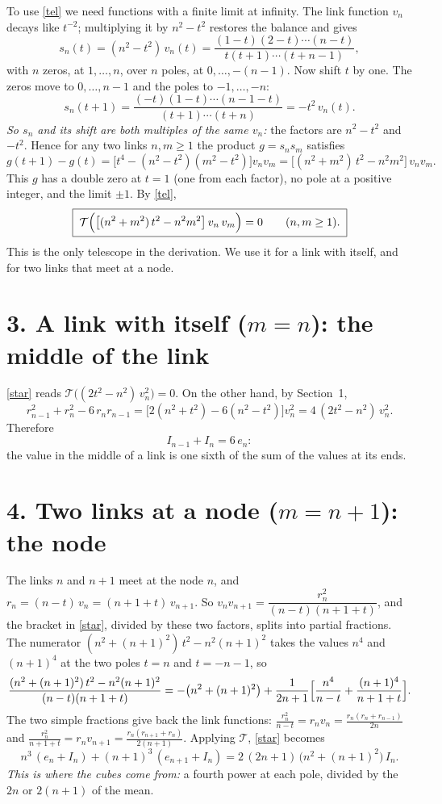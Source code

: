 \documentclass[11pt]{article}
\newcommand{\T}{\mathcal T}
\begin{document}
To use \eqref{tel} we need functions with a finite limit at infinity. The link function $v_n$ decays
like $t^{-2}$; multiplying it by $n^2-t^2$ restores the balance and gives
\[
s_n(t)=(n^2-t^2)\,v_n(t)=\frac{(1-t)(2-t)\cdots(n-t)}{t(t+1)\cdots(t+n-1)} ,
\]
with $n$ zeros, at $1,\dots,n$, over $n$ poles, at $0,\dots,-(n-1)$. Now shift $t$ by one. The zeros
move to $0,\dots,n-1$ and the poles to $-1,\dots,-n$:
\[
s_n(t+1)=\frac{(-t)(1-t)\cdots(n-1-t)}{(t+1)\cdots(t+n)}=-t^2\,v_n(t).
\]
\emph{So $s_n$ and its shift are both multiples of the same $v_n$:} the factors are $n^2-t^2$ and
$-t^2$. Hence for any two links $n,m\ge1$ the product $g=s_ns_m$ satisfies
\[
g(t+1)-g(t)=\bigl[t^4-(n^2-t^2)(m^2-t^2)\bigr]v_nv_m=\bigl[(n^2+m^2)\,t^2-n^2m^2\bigr]\,v_nv_m .
\]
This $g$ has a double zero at $t=1$ (one from each factor), no pole at a positive integer, and the
limit $\pm1$. By \eqref{tel},
\begin{equation}\label{star}
\boxed{\;\T\Bigl(\bigl[(n^2+m^2)\,t^2-n^2m^2\bigr]\,v_n\,v_m\Bigr)=0\qquad(n,m\ge1).\;}
\end{equation}
This is the only telescope in the derivation. We use it for a link with itself, and for two links
that meet at a node.

\section*{3. A link with itself ($m=n$): the middle of the link}

\eqref{star} reads $\T\bigl((2t^2-n^2)\,v_n^2\bigr)=0$. On the other hand, by Section~1,
\[
r_{n-1}^2+r_n^2-6\,r_nr_{n-1}=\bigl[2(n^2+t^2)-6(n^2-t^2)\bigr]v_n^2=4\,(2t^2-n^2)\,v_n^2 .
\]
Therefore
\begin{equation}\label{six}
I_{n-1}+I_n=6\,e_n :
\end{equation}
the value in the middle of a link is one sixth of the sum of the values at its ends.

\section*{4. Two links at a node ($m=n+1$): the node}

The links $n$ and $n+1$ meet at the node $n$, and $r_n=(n-t)\,v_n=(n+1+t)\,v_{n+1}$. So
$v_nv_{n+1}=\dfrac{r_n^2}{(n-t)(n+1+t)}$, and the bracket in \eqref{star}, divided by these two
factors, splits into partial fractions. The numerator $(n^2+(n+1)^2)\,t^2-n^2(n+1)^2$ takes the
values $n^4$ and $(n+1)^4$ at the two poles $t=n$ and $t=-n-1$, so
\[
\frac{(n^2+(n+1)^2)\,t^2-n^2(n+1)^2}{(n-t)(n+1+t)}
=-\bigl(n^2+(n+1)^2\bigr)+\frac1{2n+1}\Bigl[\frac{n^4}{n-t}+\frac{(n+1)^4}{n+1+t}\Bigr].
\]
The two simple fractions give back the link functions: $\frac{r_n^2}{n-t}=r_nv_n=\frac{r_n(r_n+r_{n-1})}{2n}$
and $\frac{r_n^2}{n+1+t}=r_nv_{n+1}=\frac{r_n(r_{n+1}+r_n)}{2(n+1)}$. Applying $\T$, \eqref{star}
becomes
\begin{equation}\label{node}
n^3\,(e_n+I_n)+(n+1)^3\,(e_{n+1}+I_n)=2\,(2n+1)\,\bigl(n^2+(n+1)^2\bigr)\,I_n .
\end{equation}
\emph{This is where the cubes come from:} a fourth power at each pole, divided by the $2n$ or
$2(n+1)$ of the mean.
\end{document}
